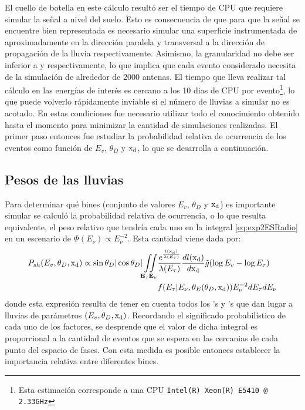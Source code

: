 El cuello de botella en este c\'alculo result\'o ser el tiempo de CPU que requiere simular la se\~nal a nivel del suelo.
Esto es consecuencia de que para que la se\~nal se encuentre bien representada es necesario simular una superficie instrumentada de aproximadamente  en la direcci\'on paralela y transversal a la direcci\'on de propagaci\'on de la lluvia respectivamente.
Asimismo, la granularidad no debe ser inferior a  y  respectivamente, lo que implica que cada evento considerado necesita de la simulaci\'on de alrededor de 2000 antenas.
El tiempo que lleva realizar tal c\'alculo en las energ\'ias de inter\'es es cercano a los 10 dias de CPU por evento\footnote{Esta estimaci\'on corresponde a una CPU \texttt{Intel(R) Xeon(R) E5410 @ 2.33GHz}}, lo que puede volverlo r\'apidamente inviable si el n\'umero de lluvias a simular no es acotado.
En estas condiciones fue necesario utilizar todo el conocimiento obtenido hasta el momento para minimizar la cantidad de simulaciones realizadas.
El primer paso entonces fue estudiar la probabilidad relativa de ocurrencia de los eventos como funci\'on de $E_v$, $\theta_D$ y ${\rm x_d}$, lo que se desarrolla a continuaci\'on.
	
	\subsection{Pesos de las lluvias}
	Para determinar qu\'e bines (conjunto de valores $E_v$, $\theta_D$ y ${\rm x_d}$) es importante simular se calcul\'o la probabilidad relativa de ocurrencia, o lo que resulta equivalente, el peso relativo que tendr\'ia cada uno en la integral \ref{eq:exp2ESRadio} en un escenario de $\Phi(E_\nu)\propto E_\nu^{-2}$.
	Esta cantidad viene dada por:
	\begin{equation}
		\begin{aligned}
			P_{sh}(E_v,\theta_D,{\rm x_d})
			\propto
			\sin{\theta_D}|\cos{\theta_D}|
			\iint\limits_{\mathbf{E_\tau}\mathbf{E_\nu}}&
			\frac{e^{\frac{l({\rm x_d})}{\lambda(E_\tau)}}}{\lambda(E_\tau)}\frac{dl({\rm x_d})}{d{\rm x_d}}
			\tilde{g}(\log E_v-\log E_\tau)\\
			&f(E_\tau|E_\nu,\theta_E(\theta_D,{\rm x_d}))
			E_\nu^{-2}
			dE_\tau dE_\nu
		\end{aligned}
		\label{eq:weightsRadio}
	\end{equation}
	donde esta expresi\'on resulta de tener en cuenta todos los \nutau{}'s y \tauon{}'s que dan lugar a lluvias de par\'ametros $(E_v,\theta_D,{\rm x_d})$.
	Recordando el significado probabil\'istico de cada uno de los factores, se desprende que el valor de dicha integral es proporcional a la cantidad de eventos que se espera en las cercanias de cada punto del espacio de fases.
	Con esta medida es posible entonces establecer la importancia relativa entre diferentes bines.
	
